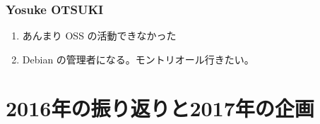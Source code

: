 \documentclass[cjk,dvipdfmx,10pt,compress,%
hyperref={bookmarks=true,bookmarksnumbered=true,bookmarksopen=false,%
colorlinks=false,%
pdftitle={第 117 回 関西 Debian 勉強会},%
pdfauthor={倉敷・のがた・佐々木・かわだ・おおつき},%
pdfsubject={資料},%
}]{beamer}
\begin{document}
\begin{frame}
  \frametitle{ Yosuke OTSUKI }
  \begin{enumerate}
  \item あんまり OSS  の活動できなかった
  \item Debian の管理者になる。モントリオール行きたい。
  \end{enumerate}
\end{frame}


\section{2016年の振り返りと2017年の企画}
\end{document}
